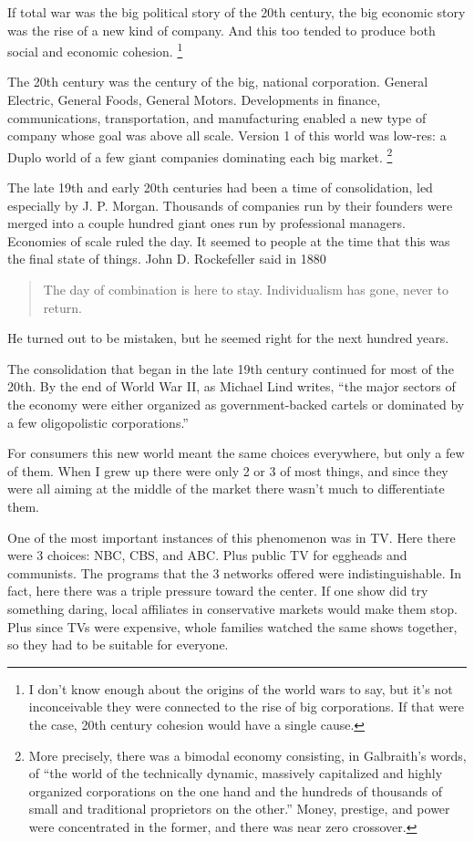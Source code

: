 If total war was the big political story of the 20th century, the big
economic story was the rise of a new kind of company. And this too
tended to produce both social and economic cohesion.
\footnote{I don't know enough about the origins of the world wars to say,
but it's not inconceivable they were connected to the rise of big
corporations. If that were the case, 20th century cohesion would have a
single cause.}

The 20th century was the century of the big, national corporation.
General Electric, General Foods, General Motors. Developments in
finance, communications, transportation, and manufacturing enabled a new
type of company whose goal was above all scale. Version 1 of this world
was low-res: a Duplo world of a few giant companies dominating each big
market. \footnote{More precisely, there was a bimodal economy consisting, in
Galbraith's words, of ``the world of the technically dynamic, massively
capitalized and highly organized corporations on the one hand and the
hundreds of thousands of small and traditional proprietors on the
other.'' Money, prestige, and power were concentrated in the former, and
there was near zero crossover.}

The late 19th and early 20th centuries had been a time of consolidation,
led especially by J. P. Morgan. Thousands of companies run by their
founders were merged into a couple hundred giant ones run by
professional managers. Economies of scale ruled the day. It seemed to
people at the time that this was the final state of things. John D.
Rockefeller said in 1880

\begin{quote}
The day of combination is here to stay. Individualism has gone, never to
return.
\end{quote}

He turned out to be mistaken, but he seemed right for the next hundred
years.

The consolidation that began in the late 19th century continued for most
of the 20th. By the end of World War II, as Michael Lind writes, ``the
major sectors of the economy were either organized as government-backed
cartels or dominated by a few oligopolistic corporations.''

For consumers this new world meant the same choices everywhere, but only
a few of them. When I grew up there were only 2 or 3 of most things, and
since they were all aiming at the middle of the market there wasn't much
to differentiate them.

One of the most important instances of this phenomenon was in TV. Here
there were 3 choices: NBC, CBS, and ABC. Plus public TV for eggheads and
communists. The programs that the 3 networks offered were
indistinguishable. In fact, here there was a triple pressure toward the
center. If one show did try something daring, local affiliates in
conservative markets would make them stop. Plus since TVs were
expensive, whole families watched the same shows together, so they had
to be suitable for everyone.

